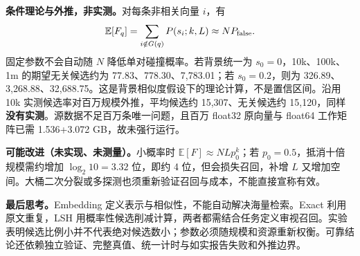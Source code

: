 \documentclass[UTF8,fontset=fandol,a4paper,10pt]{ctexart}
\begin{document}
\textbf{条件理论与外推，非实测。}对每条非相关向量 $i$，有
\[
 \mathbb E[F_q]=\sum_{i\notin G(q)}P(s_i;k,L)\approx NP_{\rm false}.
\]
固定参数不会自动随 $N$ 降低单对碰撞概率。若背景统一为 $s_0=0$，10k、100k、1m 的期望无关候选约为 77.83、778.30、7,783.01；若 $s_0=0.2$，则为 326.89、3,268.88、32,688.75。这是背景相似度假设下的理论计算，不是置信区间。沿用 10k 实测候选率对百万规模外推，平均候选约 15,307、无关候选约 15,120，同样\textbf{没有实测}。源数据不足百万条唯一问题，且百万 float32 原向量与 float64 工作矩阵已需 1.536+3.072 GB，故未强行运行。

\textbf{可能改进（未实现、未测量）。}小概率时 $\mathbb E[F]\approx NLp_0^k$；若 $p_0=0.5$，抵消十倍规模需约增加 $\log_2 10=3.32$ 位，即约 4 位，但会损失召回，补增 $L$ 又增加空间。大桶二次分裂或多探测也须重新验证召回与成本，不能直接宣称有效。

\textbf{最后思考。}Embedding 定义表示与相似性，不能自动解决海量检索。Exact 利用原文重复，LSH 用概率性候选削减计算，两者都需结合任务定义审视召回。实验表明候选比例小并不代表绝对候选数小；参数必须随规模和资源重新权衡。可靠结论还依赖独立验证、完整真值、统一计时与如实报告失败和外推边界。
\end{document}
